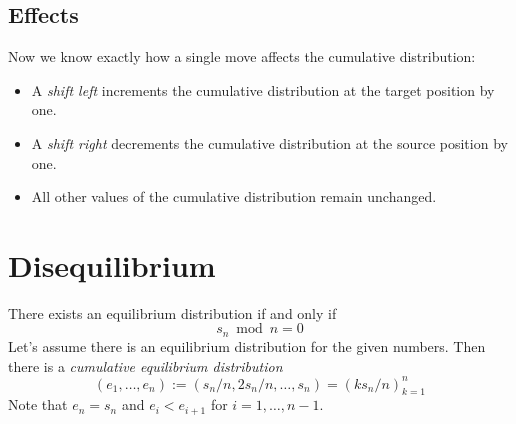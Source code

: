 \documentclass{article}
\begin{document}
\subsection*{Effects}
Now we know exactly how a single move affects the cumulative
distribution: 
\begin{itemize}{}{}
\item A \textit{shift left} increments the cumulative distribution at
  the target position by one.
\item A \textit{shift right} decrements the cumulative distribution at
  the source position by one.
\item All other values of the cumulative distribution remain unchanged.
\end{itemize}

\section*{Disequilibrium}

There exists an equilibrium distribution if and only if
\begin{displaymath}
  s_n \bmod n = 0  
\end{displaymath}
Let's assume there is an equilibrium distribution for the given
numbers.
Then there is a \textit{cumulative equilibrium distribution}
\begin{displaymath}
  (e_1,\ldots,e_n) := (s_n / n, 2 s_n / n,\ldots,s_n)
  = \left(k s_n / n\right)_{k=1}^n
\end{displaymath}
Note that $e_n = s_n$ and $e_i < e_{i+1}$ for $i = 1,\ldots,n-1$.
\end{document}
